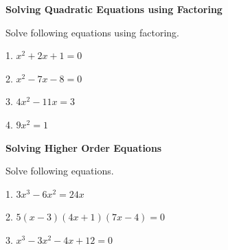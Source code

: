\documentclass[12pt]{article}
\begin{document}
\textbf{\large Solving Quadratic Equations using Factoring}

\vspace{1.5em}
Solve following equations using factoring.
\vspace{1.5em}

1. $x^{2}+2x+1=0$

\vspace{4.5em}

2. $x^{2}-7x-8=0$

\vspace{4.5em}

3. $4x^{2}-11x=3$

\vspace{4.5em}

4. $9x^{2}=1$

\vspace{4.5em}

\textbf{\large Solving Higher Order Equations}

\vspace{1.5em}
Solve following equations.
\vspace{1.5em}

1. $3x^{3}-6x^{2}=24x$
\vspace{4.5em}

2. $5(x-3)(4x+1)(7x-4)=0$
\vspace{4.5em}

3. $x^{3}-3x^{2}-4x+12=0$
\end{document}
